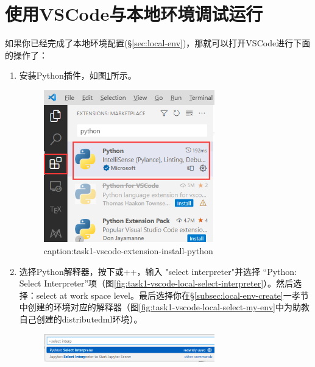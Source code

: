 \section{使用VSCode与本地环境调试运行}\label{sec:task1-local-debug}

如果你已经完成了本地环境配置(\S\ref{sec:local-env})，那就可以打开VSCode进行下面的操作了：

\begin{enumerate}
    \item 安装Python插件，如图\ref{fig:task1-vscode-extension-install-python}所示。
        \begin{figure}[htbp]
            \centering
            \includegraphics[width=0.7\textwidth]{figures/task1-vscode-extension-install-python.png}
            \caption{caption:task1-vscode-extension-install-python}
            \label{fig:task1-vscode-extension-install-python}
        \end{figure}
    \item 选择Python解释器，按下或++，输入 "select interpreter"并选择 “Python: Select Interpreter”项（图\ref{fig:task1-vscode-local-select-interpreter}）。然后选择：select at work space level。最后选择你在\S\ref{subsec:local-env-create}一孝节中创建的环境对应的解释器（图\ref{fig:task1-vscode-local-select-my-env}中为助教自己创建的distributedml环境）。
        \begin{figure}[htbp]
            \centering
            \includegraphics[width=0.7\textwidth]{figures/task1-vscode-local-select-interpreter.png}

\end{figure}
\end{enumerate}

